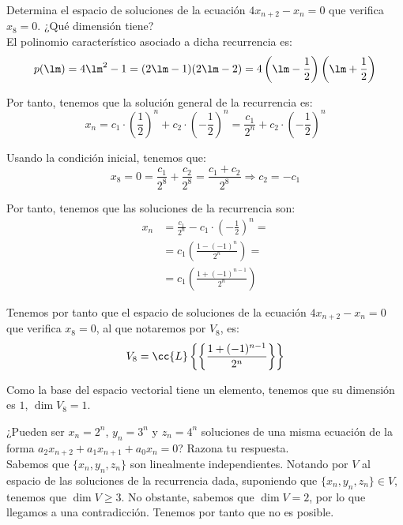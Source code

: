 \begin{ejercicio}
    Determina el espacio de soluciones de la ecuación $4x_{n+2} - x_n = 0$ que verifica $x_8 = 0$. ¿Qué dimensión tiene?\\

    El polinomio característico asociado a dicha recurrencia es:
    \begin{equation*}
        p(\lm) = 4\lm^2-1 = (2\lm-1)(2\lm-2)
        = 4\left(\lm-\frac{1}{2}\right)\left(\lm+\frac{1}{2}\right)
    \end{equation*}

    Por tanto, tenemos que la solución general de la recurrencia es:
    \begin{equation*}
        x_n = c_1\cdot \left(\frac{1}{2}\right)^n + c_2\cdot \left(-\frac{1}{2}\right)^n
        = \frac{c_1}{2^n} + c_2\cdot \left(-\frac{1}{2}\right)^n
    \end{equation*}

    Usando la condición inicial, tenemos que:
    \begin{equation*}
        x_8 = 0 = \frac{c_1}{2^8} + \frac{c_2}{2^8}
        = \frac{c_1+c_2}{2^8}\Longrightarrow c_2=-c_1
    \end{equation*}

    Por tanto, tenemos que las soluciones de la recurrencia son:
    \begin{align*}
        x_n &= \frac{c_1}{2^n} -c_1\cdot \left(-\frac{1}{2}\right)^n =\\
        &= c_1\left(\frac{1-(-1)^n}{2^n}\right) =\\
        &= c_1\left(\frac{1+(-1)^{n-1}}{2^n}\right)
    \end{align*}

    Tenemos por tanto que el espacio de soluciones de la ecuación $4x_{n+2} - x_n = 0$ que verifica $x_8 = 0$, al que notaremos por $V_8$, es:
    \begin{equation*}
        V_8 = \cc{L}\left\{\left\{\frac{1+(-1)^{n-1}}{2^n}\right\}\right\}
    \end{equation*}

    Como la base del espacio vectorial tiene un elemento, tenemos que su dimensión es $1$, $\dim V_8=1$.
\end{ejercicio}

\begin{ejercicio}
    ¿Pueden ser $x_n = 2^n$, $y_n = 3^n$ y $z_n = 4^n$ soluciones de una misma ecuación de la forma $a_2 x_{n+2} + a_1 x_{n+1} + a_0 x_n = 0$?
    Razona tu respuesta.\\

    Sabemos que $\{x_n,y_n,z_n\}$ son linealmente independientes. Notando por $V$ al espacio de las soluciones de la recurrencia dada, suponiendo que $\{x_n,y_n,z_n\}\in V$, tenemos que $\dim V\geq 3$. No obstante, sabemos que $\dim V=2$, por lo que llegamos a una contradicción.
    Tenemos por tanto que no es posible.
\end{ejercicio}

